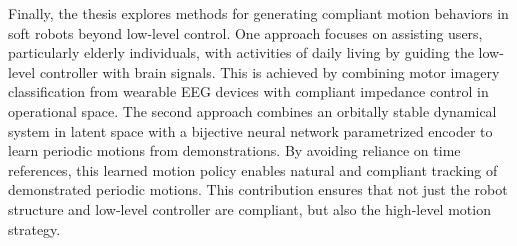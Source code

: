 Finally, the thesis explores methods for generating compliant motion behaviors in soft robots beyond low-level control. One approach focuses on assisting users, particularly elderly individuals, with activities of daily living by guiding the low-level controller with brain signals. This is achieved by combining motor imagery classification from wearable EEG devices with compliant impedance control in operational space. The second approach combines an orbitally stable dynamical system in latent space with a bijective neural network parametrized encoder to learn periodic motions from demonstrations. By avoiding reliance on time references, this learned motion policy enables natural and compliant tracking of demonstrated periodic motions. This contribution ensures that not just the robot structure and low-level controller are compliant, but also the high-level motion strategy.




